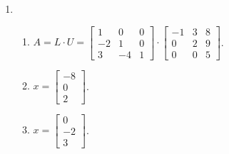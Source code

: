 \documentclass[12pt,a4paper]{article}
\begin{document}
\begin{enumerate}
\item
\begin{enumerate}
\item $A = L \cdot U =
\begin{bmatrix}
 1 &  0 & 0 \\
-2 &  1 & 0 \\
 3 & -4 & 1
\end{bmatrix}
\cdot
\begin{bmatrix}
-1 & 3 & 8 \\
 0 & 2 & 9 \\
 0 & 0 & 5
\end{bmatrix}
$.

\item
$ x = \begin{bmatrix}
-8 \\ 0 \\ 2
\end{bmatrix}$.
\item
$ x = \begin{bmatrix}
0 \\ -2 \\ 3
\end{bmatrix}$.
\end{enumerate}


\end{enumerate}
\end{document}

